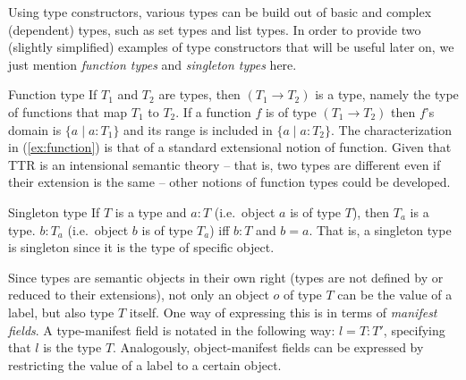 \documentclass[output=paper,biblatex,babelshorthands,newtxmath,draftmode,colorlinks,citecolor=brown]{langscibook}
\begin{document}

Using type constructors, various types can be build out of basic and complex (dependent) types, such as set types and list types. 
%
In order to provide two (slightly simplified) examples of type constructors that will be useful later on, we just mention \emph{function types} and \emph{singleton types} here.

\ea Function type \label{ex:function}
\ea If $T_1$ and $T_2$ are types, then $(T_1 \rightarrow T_2)$ is a type, namely the type of functions that map $T_1$ to $T_2$.
\ex If a function $f$ is of type $(T_1 \rightarrow T_2)$ then $f$'s domain is $\{a \mid a : T_1\}$ and its range is included in $\{a \mid a : T_2\}$.
\z
\z 
%
The characterization in (\ref{ex:function}) is that of a standard extensional notion of function. 
%
Given that TTR is an intensional semantic theory -- that is, two types are different even if their extension is the same -- other notions of function types could be developed.


\ea Singleton type
\ea If $T$ is a type and $a : T$ (i.e.\ object $a$ is of type $T$), then $T_a$ is a type.
\ex $b : T_a$ (i.e.\ object $b$ is of type $T_a$) iff $b : T$ and $b = a$.
\z
\z
%
That is, a singleton type is singleton since it is the type of specific object. 

\largerpage
Since types are semantic objects in their own right (types are not defined by or reduced to their extensions), not only an object $o$ of type $T$ can be the value of a label, but also  type $T$ itself.
%
One way of expressing this is in terms of 
\emph{manifest fields}.
%
A type-manifest field is notated in the following way: $l=T : T'$, specifying that $l$ is the type $T$.
%
Analogously, object-manifest fields can be expressed by restricting the value of a label to a certain object.
\end{document}
